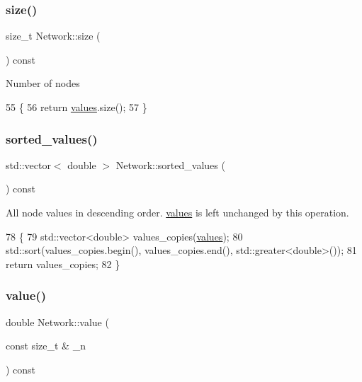 \subsubsection{\texorpdfstring{size()}{size()}}
{\footnotesize\ttfamily size\+\_\+t Network\+::size (\begin{DoxyParamCaption}{ }\end{DoxyParamCaption}) const}

Number of nodes 
\begin{DoxyCode}
55 \{
56     \textcolor{keywordflow}{return} \mbox{\hyperlink{classNetwork_ab4062dd3b2fc7825f21a686d76e3c696}{values}}.size();
57 \}
\end{DoxyCode}
\mbox{\label{classNetwork_a9f79d1f7ffd359d879f647da3eaf95b3}} 
\subsubsection{\texorpdfstring{sorted\+\_\+values()}{sorted\_values()}}
{\footnotesize\ttfamily std\+::vector$<$ double $>$ Network\+::sorted\+\_\+values (\begin{DoxyParamCaption}{ }\end{DoxyParamCaption}) const}

All node values in descending order. \mbox{\hyperlink{classNetwork_ab4062dd3b2fc7825f21a686d76e3c696}{values}} is left unchanged by this operation. 
\begin{DoxyCode}
78 \{
79     std::vector<double> values\_copies(\mbox{\hyperlink{classNetwork_ab4062dd3b2fc7825f21a686d76e3c696}{values}});
80     std::sort(values\_copies.begin(), values\_copies.end(), std::greater<double>());
81     \textcolor{keywordflow}{return} values\_copies;
82 \}
\end{DoxyCode}
\mbox{\label{classNetwork_a9b9cb94c0af24ce5417d840727fb5ad3}} 
\subsubsection{\texorpdfstring{value()}{value()}}
{\footnotesize\ttfamily double Network\+::value (\begin{DoxyParamCaption}\item[{const size\+\_\+t \&}]{\+\_\+n }\end{DoxyParamCaption}) const}

